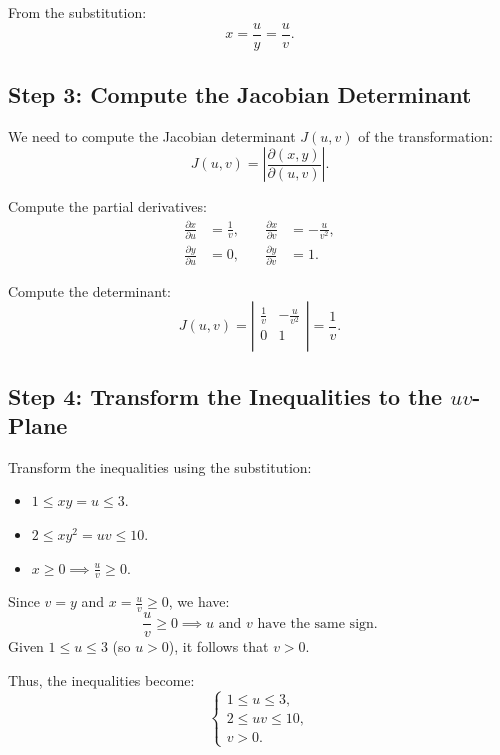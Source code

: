 \documentclass[11pt]{article}
\begin{document}
From the substitution:
\[
x = \frac{u}{y} = \frac{u}{v}.
\]

\newpage

\subsection{Step 3: Compute the Jacobian Determinant}

We need to compute the Jacobian determinant \( J(u, v) \) of the transformation:
\[
J(u, v) = \left| \frac{\partial(x, y)}{\partial(u, v)} \right|.
\]

Compute the partial derivatives:
\[
\begin{aligned}
\frac{\partial x}{\partial u} &= \frac{1}{v}, \quad &\frac{\partial x}{\partial v} &= -\frac{u}{v^2}, \\
\frac{\partial y}{\partial u} &= 0, \quad &\frac{\partial y}{\partial v} &= 1.
\end{aligned}
\]

Compute the determinant:
\[
J(u, v) = \left| \begin{array}{cc}
\frac{1}{v} & -\frac{u}{v^2} \\
0 & 1 \\
\end{array} \right| = \frac{1}{v}.
\]

\newpage

\subsection{Step 4: Transform the Inequalities to the \( uv \)-Plane}

Transform the inequalities using the substitution:
\begin{itemize}
    \item \( 1 \leq x y = u \leq 3 \).
    \item \( 2 \leq x y^2 = u v \leq 10 \).
    \item \( x \geq 0 \implies \frac{u}{v} \geq 0 \).
\end{itemize}

Since \( v = y \) and \( x = \frac{u}{v} \geq 0 \), we have:
\[
\frac{u}{v} \geq 0 \implies u \text{ and } v \text{ have the same sign}.
\]
Given \( 1 \leq u \leq 3 \) (so \( u > 0 \)), it follows that \( v > 0 \).

Thus, the inequalities become:
\[
\begin{cases}
1 \leq u \leq 3, \\
2 \leq u v \leq 10, \\
v > 0.
\end{cases}
\]
\end{document}
